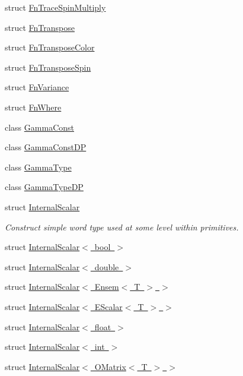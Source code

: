 \begin{DoxyCompactItemize}
struct \mbox{\hyperlink{structENSEM_1_1FnTraceSpinMultiply}{Fn\+Trace\+Spin\+Multiply}}
\item 
struct \mbox{\hyperlink{structENSEM_1_1FnTranspose}{Fn\+Transpose}}
\item 
struct \mbox{\hyperlink{structENSEM_1_1FnTransposeColor}{Fn\+Transpose\+Color}}
\item 
struct \mbox{\hyperlink{structENSEM_1_1FnTransposeSpin}{Fn\+Transpose\+Spin}}
\item 
struct \mbox{\hyperlink{structENSEM_1_1FnVariance}{Fn\+Variance}}
\item 
struct \mbox{\hyperlink{structENSEM_1_1FnWhere}{Fn\+Where}}
\item 
class \mbox{\hyperlink{classENSEM_1_1GammaConst}{Gamma\+Const}}
\item 
class \mbox{\hyperlink{classENSEM_1_1GammaConstDP}{Gamma\+Const\+DP}}
\item 
class \mbox{\hyperlink{classENSEM_1_1GammaType}{Gamma\+Type}}
\item 
class \mbox{\hyperlink{classENSEM_1_1GammaTypeDP}{Gamma\+Type\+DP}}
\item 
struct \mbox{\hyperlink{structENSEM_1_1InternalScalar}{Internal\+Scalar}}
\begin{DoxyCompactList}\small\item\em Construct simple word type used at some level within primitives. \end{DoxyCompactList}\item 
struct \mbox{\hyperlink{structENSEM_1_1InternalScalar_3_01bool_01_4}{Internal\+Scalar$<$ bool $>$}}
\item 
struct \mbox{\hyperlink{structENSEM_1_1InternalScalar_3_01double_01_4}{Internal\+Scalar$<$ double $>$}}
\item 
struct \mbox{\hyperlink{structENSEM_1_1InternalScalar_3_01Ensem_3_01T_01_4_01_4}{Internal\+Scalar$<$ Ensem$<$ T $>$ $>$}}
\item 
struct \mbox{\hyperlink{structENSEM_1_1InternalScalar_3_01EScalar_3_01T_01_4_01_4}{Internal\+Scalar$<$ E\+Scalar$<$ T $>$ $>$}}
\item 
struct \mbox{\hyperlink{structENSEM_1_1InternalScalar_3_01float_01_4}{Internal\+Scalar$<$ float $>$}}
\item 
struct \mbox{\hyperlink{structENSEM_1_1InternalScalar_3_01int_01_4}{Internal\+Scalar$<$ int $>$}}
\item 
struct \mbox{\hyperlink{structENSEM_1_1InternalScalar_3_01OMatrix_3_01T_01_4_01_4}{Internal\+Scalar$<$ O\+Matrix$<$ T $>$ $>$}}

\end{DoxyCompactItemize}
